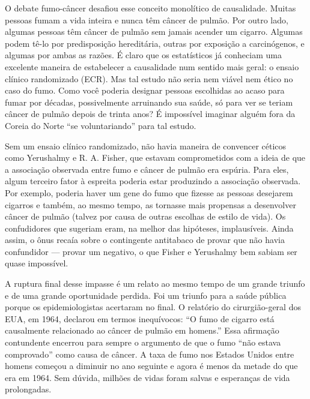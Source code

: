 \documentclass[11pt,a5paper,twoside]{book}
\begin{document}
O debate fumo-câncer desafiou esse conceito monolítico de causalidade. Muitas pessoas fumam a vida inteira e nunca têm câncer de pulmão. Por outro lado, algumas pessoas têm câncer de pulmão sem jamais acender um cigarro. Algumas podem tê-lo por predisposição hereditária, outras por exposição a carcinógenos, e algumas por ambas as razões. É claro que os estatísticos já conheciam uma excelente maneira de estabelecer a causalidade num sentido mais geral: o ensaio clínico randomizado (ECR). Mas tal estudo não seria nem viável nem ético no caso do fumo. Como você poderia designar pessoas escolhidas ao acaso para fumar por décadas, possivelmente arruinando sua saúde, só para ver se teriam câncer de pulmão depois de trinta anos? É impossível imaginar alguém fora da Coreia do Norte “se voluntariando” para tal estudo.

Sem um ensaio clínico randomizado, não havia maneira de convencer céticos como Yerushalmy e R. A. Fisher, que estavam comprometidos com a ideia de que a associação observada entre fumo e câncer de pulmão era espúria. Para eles, algum terceiro fator à espreita poderia estar produzindo a associação observada. Por exemplo, poderia haver um gene do fumo que fizesse as pessoas desejarem cigarros e também, ao mesmo tempo, as tornasse mais propensas a desenvolver câncer de pulmão (talvez por causa de outras escolhas de estilo de vida). Os confudidores que sugeriam eram, na melhor das hipóteses, implausíveis. Ainda assim, o ônus recaía sobre o contingente antitabaco de provar que não havia confundidor — provar um negativo, o que Fisher e Yerushalmy bem sabiam ser quase impossível.

A ruptura final desse impasse é um relato ao mesmo tempo de um grande triunfo e de uma grande oportunidade perdida. Foi um triunfo para a saúde pública porque os epidemiologistas acertaram no final. O relatório do cirurgião-geral dos EUA, em 1964, declarou em termos inequívocos: “O fumo de cigarro está causalmente relacionado ao câncer de pulmão em homens.” Essa afirmação contundente encerrou para sempre o argumento de que o fumo “não estava comprovado” como causa de câncer. A taxa de fumo nos Estados Unidos entre homens começou a diminuir no ano seguinte e agora é menos da metade do que era em 1964. Sem dúvida, milhões de vidas foram salvas e esperanças de vida prolongadas.
\end{document}
